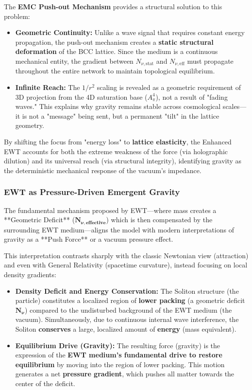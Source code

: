 \documentclass[10pt,a4paper]{article}
\begin{document}
The \textbf{EMC Push-out Mechanism} provides a structural solution to this problem:

\begin{itemize}
	\item \textbf{Geometric Continuity:} Unlike a wave signal that requires constant energy propagation, the push-out mechanism creates a \textbf{static structural deformation} of the BCC lattice. Since the medium is a continuous mechanical entity, the gradient between $N_{\nu, \text{stat}}$ and $N_{\nu, \text{eff}}$ must propagate throughout the entire network to maintain topological equilibrium.
	\item \textbf{Infinite Reach:} The $1/r^2$ scaling is revealed as a geometric requirement of 3D projection from the 4D saturation base ($A_{\pi}^4$), not a result of "fading waves." This explains why gravity remains stable across cosmological scales—it is not a "message" being sent, but a permanent "tilt" in the lattice geometry.
\end{itemize}



By shifting the focus from "energy loss" to \textbf{lattice elasticity}, the Enhanced EWT accounts for both the extreme weakness of the force (via holographic dilution) and its universal reach (via structural integrity), identifying gravity as the deterministic mechanical response of the vacuum's impedance.

\subsubsection{EWT as Pressure-Driven Emergent Gravity}
\label{subsubsec:pressure_driven}

The fundamental mechanism proposed by EWT—where mass creates a **Geometric Deficit** ($\mathbf{N_{\nu, \text{effective}}}$) which is then compensated by the surrounding EWT medium—aligns the model with modern interpretations of gravity as a **Push Force** or a vacuum pressure effect.

This interpretation contrasts sharply with the classic Newtonian view (attraction) and even with General Relativity (spacetime curvature), instead focusing on local density gradients:

\begin{itemize}
	\item \textbf{Density Deficit and Energy Conservation:} The Soliton structure (the particle) constitutes a localized region of \textbf{lower packing} (a geometric deficit $\mathbf{N_{\nu}}$) compared to the undisturbed background of the EWT medium (the vacuum). Simultaneously, due to continuous internal wave interference, the Soliton \textbf{conserves} a large, localized amount of \textbf{energy} (mass equivalent).
	\item \textbf{Equilibrium Drive (Gravity):} The resulting force (gravity) is the expression of the \textbf{EWT medium's fundamental drive to restore equilibrium} by moving into the region of lower packing. This motion generates a net \textbf{pressure gradient}, which pushes all matter towards the center of the deficit.
\end{itemize}
\end{document}
